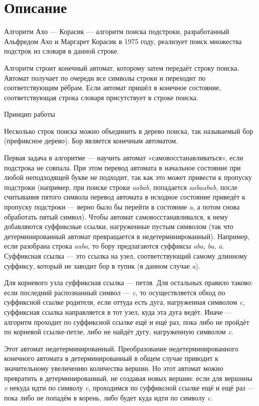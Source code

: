 \section{Описание}
Алгоритм Ахо — Корасик — алгоритм поиска подстроки, разработанный Альфредом Ахо и Маргарет Корасик в 1975 году, реализует поиск множества подстрок из словаря в данной строке.


Алгоритм строит конечный автомат, которому затем передаёт строку поиска. Автомат получает по очереди все символы строки и переходит по соответствующим рёбрам. Если автомат пришёл в конечное состояние, соответствующая строка словаря присутствует в строке поиска.

Принцип работы

Несколько строк поиска можно объединить в дерево поиска, так называемый бор (префиксное дерево). Бор является конечным автоматом.

Первая задача в алгоритме — научить автомат «самовосстанавливаться», если подстрока не совпала. При этом перевод автомата в начальное состояние при любой неподходящей букве не подходит, так как это может привести к пропуску подстроки (например, при поиске строки \textit{aabab}, попадается \textit{aabaabab}, после считывания пятого символа перевод автомата в исходное состояние приведёт к пропуску подстроки — верно было бы перейти в состояние \textit{a}, а потом снова обработать пятый символ). Чтобы автомат самовосстанавливался, к нему добавляются суффиксные ссылки, нагруженные пустым символом (так что детерминированный автомат превращается в недетерминированный). Например, если разобрана строка \textit{aaba}, то бору предлагаются суффиксы \textit{aba}, \textit{ba}, \textit{a}. Суффиксная ссылка — это ссылка на узел, соответствующий самому длинному суффиксу, который не заводит бор в тупик (в данном случае \textit{a}).

Для корневого узла суффиксная ссылка — петля. Для остальных правило таково: если последний распознанный символ — \textit{c}, то осуществляется обход по суффиксной ссылке родителя, если оттуда есть дуга, нагруженная символом \textit{c}, суффиксная ссылка направляется в тот узел, куда эта дуга ведёт. Иначе — алгоритм проходит по суффиксной ссылке ещё и ещё раз, пока либо не пройдёт по корневой ссылке-петле, либо не найдёт дугу, нагруженную символом \textit{c}.

Этот автомат недетерминированный. Преобразование недетерминированного конечного автомата в детерминированный в общем случае приводит к значительному увеличению количества вершин. Но этот автомат можно превратить в детерминированный, не создавая новых вершин: если для вершины \textit{v} некуда идти по символу \textit{c}, проходимся по суффиксной ссылке ещё и ещё раз — пока либо не попадём в корень, либо будет куда идти по символу \textit{c}.


